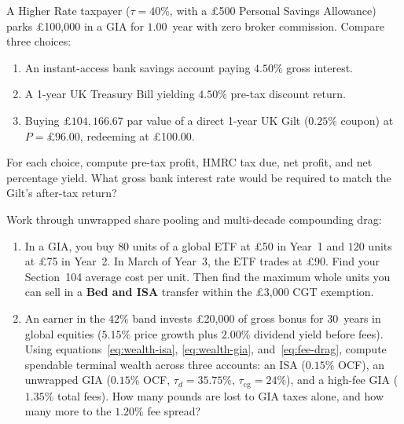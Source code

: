 \begin{exercise}
A Higher Rate taxpayer ($\tau = 40\%$, with a \pounds 500 Personal Savings Allowance) parks \pounds 100,000 in a GIA for $1.00$~year with zero broker commission. Compare three choices:
\begin{enumerate}[label=(\alph*)]
  \item An instant-access bank savings account paying $4.50\%$ gross interest.
  \item A 1-year UK Treasury Bill yielding $4.50\%$ pre-tax discount return.
  \item Buying $\pounds 104{,}166.67$ par value of a direct 1-year UK Gilt ($0.25\%$ coupon) at $P = \pounds 96.00$, redeeming at \pounds 100.00.
\end{enumerate}
For each choice, compute pre-tax profit, HMRC tax due, net profit, and net percentage yield. What gross bank interest rate would be required to match the Gilt's after-tax return?
\end{exercise}

\begin{exercise}
Work through unwrapped share pooling and multi-decade compounding drag:
\begin{enumerate}[label=(\alph*)]
  \item In a GIA, you buy $80$ units of a global ETF at \pounds 50 in Year~1 and $120$ units at \pounds 75 in Year~2. In March of Year~3, the ETF trades at \pounds 90. Find your Section~104 average cost per unit. Then find the maximum whole units you can sell in a \textbf{Bed and ISA} transfer within the \pounds 3,000 CGT exemption.
  \item An earner in the $42\%$ band invests \pounds 20,000 of gross bonus for $30$~years in global equities ($5.15\%$ price growth plus $2.00\%$ dividend yield before fees). Using equations~\eqref{eq:wealth-isa}, \eqref{eq:wealth-gia}, and~\eqref{eq:fee-drag}, compute spendable terminal wealth across three accounts: an ISA ($0.15\%$ OCF), an unwrapped GIA ($0.15\%$ OCF, $\tau_d = 35.75\%$, $\tau_{\text{cg}} = 24\%$), and a high-fee GIA ($1.35\%$ total fees). How many pounds are lost to GIA taxes alone, and how many more to the $1.20\%$ fee spread?
\end{enumerate}
\end{exercise}
